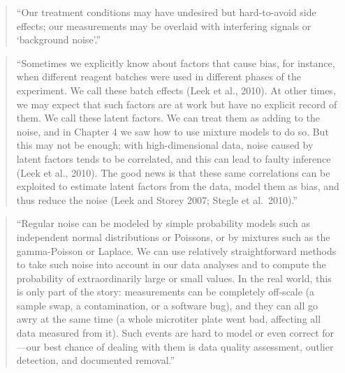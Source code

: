 \documentclass[]{tufte-book}
\begin{document}
\begin{quote}
``Our treatment conditions may have undesired but hard-to-avoid side effects;
our measurements may be overlaid with interfering signals or `background noise'.''
\citep{holmes2018modern}
\end{quote}

\begin{quote}
``Sometimes we explicitly know about factors that cause bias, for instance, when
different reagent batches were used in different phases of the experiment. We
call these batch effects (Leek et al., 2010). At other times, we may expect that
such factors are at work but have no explicit record of them. We call these
latent factors. We can treat them as adding to the noise, and in Chapter
4 we saw how to use mixture models to do so. But this may not be enough; with
high-dimensional data, noise caused by latent factors tends to be correlated,
and this can lead to faulty inference (Leek et al., 2010). The good news is that
these same correlations can be exploited to estimate latent factors from
the data, model them as bias, and thus reduce the noise (Leek and Storey 2007;
Stegle et al.~2010).'' \citep{holmes2018modern}
\end{quote}

\begin{quote}
``Regular noise can be modeled by simple probability models such as independent
normal distributions or Poissons, or by mixtures such as the gamma-Poisson or
Laplace. We can use relatively straightforward methods to take such noise into
account in our data analyses and to compute the probability of extraordinarily
large or small values. In the real world, this is only part of the story:
measurements can be completely off-scale (a sample swap, a contamination, or
a software bug), and they can all go awry at the same time (a whole microtiter
plate went bad, affecting all data measured from it). Such events are hard to model
or even correct for---our best chance of dealing with them is data quality
assessment, outlier detection, and documented removal.'' \citep{holmes2018modern}
\end{quote}
\end{document}
